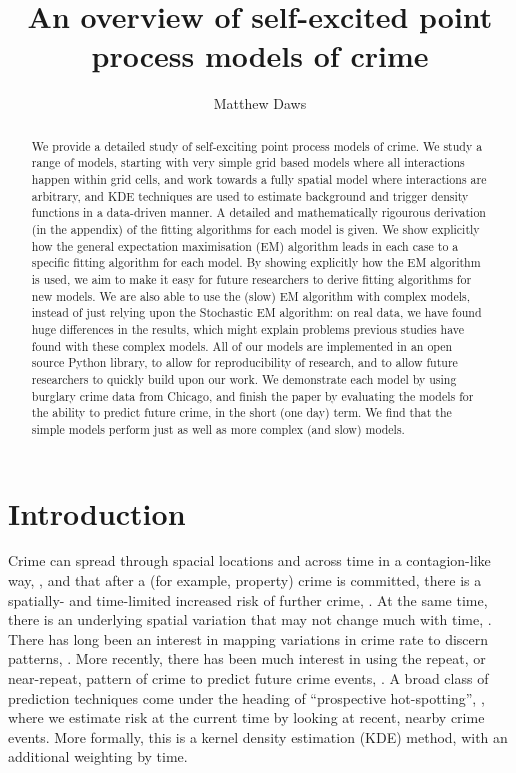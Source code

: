 \documentclass[twoside,a4paper]{article}
\theoremstyle{plain}
\theoremstyle{definition}
\begin{document}
\large
\title{An overview of self-excited point process models of crime}
\author{Matthew Daws}
\maketitle

\begin{abstract}
We provide a detailed study of self-exciting point process models of crime.
We study a range of models, starting with very simple grid based models where all
interactions happen within grid cells, and work towards a fully spatial model where
interactions are arbitrary, and KDE techniques are used to estimate background and
trigger density functions in a data-driven manner.
A detailed and mathematically rigourous derivation (in the appendix) of the fitting
algorithms for each model is given.  We show explicitly how the general expectation
maximisation (EM) algorithm leads in each case to a specific fitting algorithm for each model.
By showing explicitly how the EM algorithm is used, we aim to make it easy for future
researchers to derive fitting algorithms for new models.  We are also able to use the
(slow) EM algorithm with complex models, instead of just relying upon the Stochastic
EM algorithm: on real data, we have found huge differences in the results, which might
explain problems previous studies have found with these complex models.  All of our
models are implemented in an open source Python library, to allow for reproducibility
of research, and to allow future researchers to quickly build upon our work.  We demonstrate
each model by using burglary crime data from Chicago, and finish the paper by evaluating
the models for the ability to predict future crime, in the short (one day) term.  We find that
the simple models perform just as well as more complex (and slow) models.
\end{abstract}


\section{Introduction}

Crime can spread through spacial locations and across time in a contagion-like way,
\cite{johnson}, and that after a (for example, property) crime is committed, there is
a spatially- and time-limited increased risk of further crime, \cite{jbberrt}.  At
the same time, there is an underlying spatial variation that may not change much with time,
\cite{johnson, bn}.  There has long been an interest in mapping variations in crime rate
to discern patterns, \cite{glv}.  More recently, there has been much interest in using
the repeat, or near-repeat, pattern of crime to predict future crime events, \cite{glv, jb, rand}.
A broad class of prediction techniques come under the heading of ``prospective hot-spotting'',
\cite{bjp, jbmbp}, where we estimate risk at the current time by looking at recent,
nearby crime events.  More formally, this is a kernel density estimation (KDE) method,
with an additional weighting by time.
\end{document}
